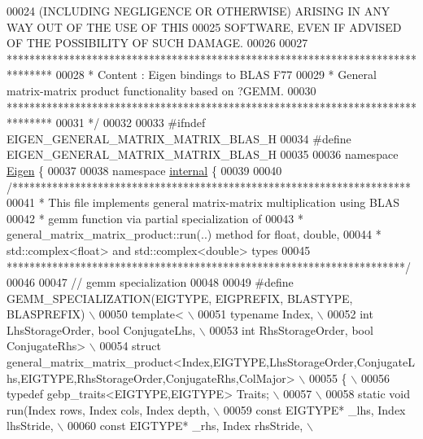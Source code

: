 \begin{DoxyCode}
00024 \textcolor{comment}{ (INCLUDING NEGLIGENCE OR OTHERWISE) ARISING IN ANY WAY OUT OF THE USE OF THIS}
00025 \textcolor{comment}{ SOFTWARE, EVEN IF ADVISED OF THE POSSIBILITY OF SUCH DAMAGE.}
00026 \textcolor{comment}{}
00027 \textcolor{comment}{ ********************************************************************************}
00028 \textcolor{comment}{ *   Content : Eigen bindings to BLAS F77}
00029 \textcolor{comment}{ *   General matrix-matrix product functionality based on ?GEMM.}
00030 \textcolor{comment}{ ********************************************************************************}
00031 \textcolor{comment}{*/}
00032 
00033 \textcolor{preprocessor}{#ifndef EIGEN\_GENERAL\_MATRIX\_MATRIX\_BLAS\_H}
00034 \textcolor{preprocessor}{#define EIGEN\_GENERAL\_MATRIX\_MATRIX\_BLAS\_H}
00035 
00036 \textcolor{keyword}{namespace }\hyperlink{namespace_eigen}{Eigen} \{ 
00037 
00038 \textcolor{keyword}{namespace }\hyperlink{namespaceinternal}{internal} \{
00039 
00040 \textcolor{comment}{/**********************************************************************}
00041 \textcolor{comment}{* This file implements general matrix-matrix multiplication using BLAS}
00042 \textcolor{comment}{* gemm function via partial specialization of}
00043 \textcolor{comment}{* general\_matrix\_matrix\_product::run(..) method for float, double,}
00044 \textcolor{comment}{* std::complex<float> and std::complex<double> types}
00045 \textcolor{comment}{**********************************************************************/}
00046 
00047 \textcolor{comment}{// gemm specialization}
00048 
00049 \textcolor{preprocessor}{#define GEMM\_SPECIALIZATION(EIGTYPE, EIGPREFIX, BLASTYPE, BLASPREFIX) \(\backslash\)}
00050 \textcolor{preprocessor}{template< \(\backslash\)}
00051 \textcolor{preprocessor}{  typename Index, \(\backslash\)}
00052 \textcolor{preprocessor}{  int LhsStorageOrder, bool ConjugateLhs, \(\backslash\)}
00053 \textcolor{preprocessor}{  int RhsStorageOrder, bool ConjugateRhs> \(\backslash\)}
00054 \textcolor{preprocessor}{struct
       general\_matrix\_matrix\_product<Index,EIGTYPE,LhsStorageOrder,ConjugateLhs,EIGTYPE,RhsStorageOrder,ConjugateRhs,ColMajor> \(\backslash\)}
00055 \textcolor{preprocessor}{\{ \(\backslash\)}
00056 \textcolor{preprocessor}{typedef gebp\_traits<EIGTYPE,EIGTYPE> Traits; \(\backslash\)}
00057 \textcolor{preprocessor}{\(\backslash\)}
00058 \textcolor{preprocessor}{static void run(Index rows, Index cols, Index depth, \(\backslash\)}
00059 \textcolor{preprocessor}{  const EIGTYPE* \_lhs, Index lhsStride, \(\backslash\)}
00060 \textcolor{preprocessor}{  const EIGTYPE* \_rhs, Index rhsStride, \(\backslash\)}

\end{DoxyCode}
